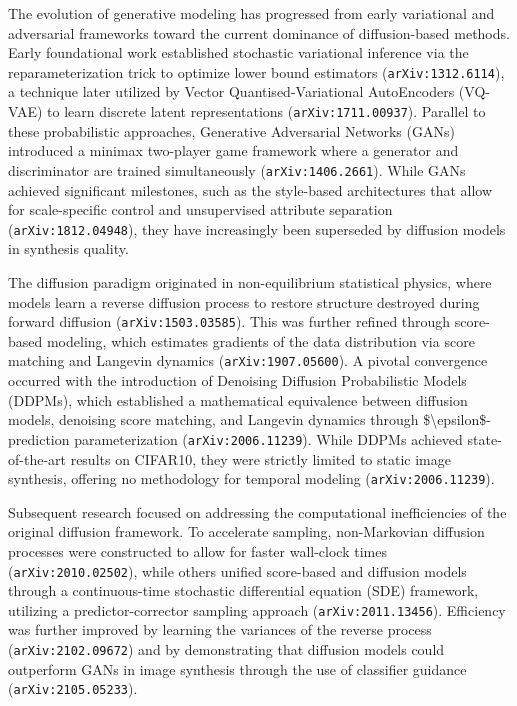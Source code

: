 \documentclass[11pt]{article}
\begin{document}
The evolution of generative modeling has progressed from early variational and adversarial frameworks toward the current dominance of diffusion-based methods. Early foundational work established stochastic variational inference via the reparameterization trick to optimize lower bound estimators (\texttt{arXiv:1312.6114}), a technique later utilized by Vector Quantised-Variational AutoEncoders (VQ-VAE) to learn discrete latent representations (\texttt{arXiv:1711.00937}). Parallel to these probabilistic approaches, Generative Adversarial Networks (GANs) introduced a minimax two-player game framework where a generator and discriminator are trained simultaneously (\texttt{arXiv:1406.2661}). While GANs achieved significant milestones, such as the style-based architectures that allow for scale-specific control and unsupervised attribute separation (\texttt{arXiv:1812.04948}), they have increasingly been superseded by diffusion models in synthesis quality.

The diffusion paradigm originated in non-equilibrium statistical physics, where models learn a reverse diffusion process to restore structure destroyed during forward diffusion (\texttt{arXiv:1503.03585}). This was further refined through score-based modeling, which estimates gradients of the data distribution via score matching and Langevin dynamics (\texttt{arXiv:1907.05600}). A pivotal convergence occurred with the introduction of Denoising Diffusion Probabilistic Models (DDPMs), which established a mathematical equivalence between diffusion models, denoising score matching, and Langevin dynamics through \$\textbackslash{}epsilon\$-prediction parameterization (\texttt{arXiv:2006.11239}). While DDPMs achieved state-of-the-art results on CIFAR10, they were strictly limited to static image synthesis, offering no methodology for temporal modeling (\texttt{arXiv:2006.11239}).

Subsequent research focused on addressing the computational inefficiencies of the original diffusion framework. To accelerate sampling, non-Markovian diffusion processes were constructed to allow for faster wall-clock times (\texttt{arXiv:2010.02502}), while others unified score-based and diffusion models through a continuous-time stochastic differential equation (SDE) framework, utilizing a predictor-corrector sampling approach (\texttt{arXiv:2011.13456}). Efficiency was further improved by learning the variances of the reverse process (\texttt{arXiv:2102.09672}) and by demonstrating that diffusion models could outperform GANs in image synthesis through the use of classifier guidance (\texttt{arXiv:2105.05233}).
\end{document}
